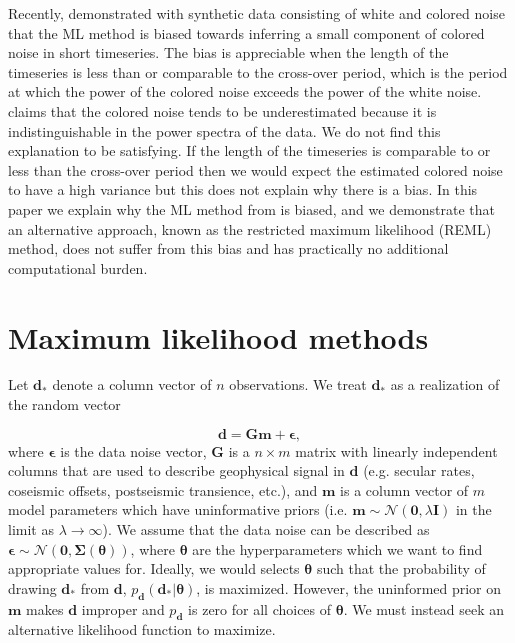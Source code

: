 \documentclass[10pt,a4paper]{article}
\begin{document}
Recently, \citet{Langbein2012} demonstrated with synthetic data consisting of white and colored noise that the ML method is biased towards inferring a small component of colored noise in short timeseries.  The bias is appreciable when the length of the timeseries is less than or comparable to the cross-over period, which is the period at which the power of the colored noise exceeds the power of the white noise. \citet{Langbein2012} claims that the colored noise tends to be underestimated because it is indistinguishable in the power spectra of the data. We do not find this explanation to be satisfying. If the length of the timeseries is comparable to or less than the cross-over period then we would expect the estimated colored noise to have a high variance but this does not explain why there is a bias. In this paper we explain why the ML method from \citet{Langbein1997} is biased, and we demonstrate that an alternative approach, known as the restricted maximum likelihood (REML) method, does not suffer from this bias and has practically no additional computational burden. 

\section{Maximum likelihood methods}

Let $\mathbf{d_*}$ denote a column vector of $n$ observations. We treat $\mathbf{d_*}$ as a realization of the random vector

\begin{equation}\label{LangbeinModel}
  \mathbf{d} = \mathbf{Gm} + \mathbf{\epsilon},
\end{equation}
where $\mathbf{\epsilon}$ is the data noise vector, $\mathbf{G}$ is a $n \times m$ matrix with linearly independent columns that are used to describe geophysical signal in $\mathbf{d}$ (e.g. secular rates, coseismic offsets, postseismic transience, etc.), and $\mathbf{m}$ is a column vector of $m$ model parameters which have uninformative priors (i.e. $\mathbf{m} \sim \mathcal{N}(\mathbf{0},\lambda\mathbf{I})$ in the limit as $\lambda \to \infty$).  We assume that the data noise can be described as $\mathbf{\epsilon} \sim \mathcal{N}(\mathbf{0},\mathbf{\Sigma}(\mathbf{\theta}))$, where $\mathbf{\theta}$ are the hyperparameters which we want to find appropriate values for. Ideally, we would selects $\mathbf{\theta}$ such that the probability of drawing $\mathbf{d_*}$ from $\mathbf{d}$, $p_\mathbf{d}(\mathbf{d_*}|\mathbf{\theta})$, is maximized. However, the uninformed prior on $\mathbf{m}$ makes $\mathbf{d}$ improper and $p_\mathbf{d}$ is zero for all choices of $\mathbf{\theta}$. We must instead seek an alternative likelihood function to maximize. 
\end{document}
